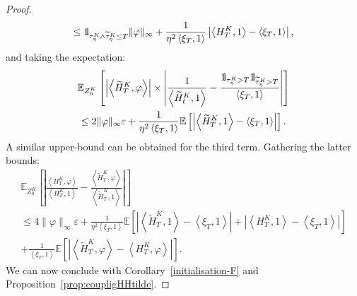\documentclass[10pt]{amsart}
\theoremstyle{definition}\newtheorem{defi}[theo]{Definition}\newtheorem{rema}[theo]{Remark}\newtheorem{exam}[theo]{Example}\newtheorem{exem}[theo]{Example}\newtheorem{nota}[theo]{Notation}
\newcommand*\E{\mathbb{E}}
\newcommand*\ind{{\mathchoice {\rm 1\mskip-4mu l} {\rm 1\mskip-4mu l} {\rm 1\mskip-4.5mu l} {\rm 1\mskip-5mu l}}}
\begin{document}
\begin{proof}
\begin{multline*}
\leq \ind_{\tau^K_\eta \wedge \widetilde{\tau}^K_\eta \leq T}
\|\varphi\|_\infty + \frac{1}{\eta^2\left\langle \xi_T,1\right\rangle}\left|\left\langle H^K_T,1\right\rangle - \left\langle \xi_T,1\right\rangle\right|,
\end{multline*}
and taking the expectation:
\begin{multline*}
\E_{Z^K_0}\left[\left|\left\langle \widetilde{H}^K_T,\varphi\right\rangle \right| \times \left|\frac{1}{\left\langle \widetilde{H}^K_t,1\right\rangle}- \frac{\ind_{\tau^K_\eta > T}\ind_{\widetilde{\tau}^K_\eta > T}}{\left\langle \xi_T,1\right\rangle}\right|\right]\\
\leq 2 \|\varphi\|_\infty \varepsilon + \frac{1}{\eta^2 \left\langle \xi_T,1\right\rangle}\E\left[\left|\left\langle \widetilde{H}^K_T,1\right\rangle - \left\langle \xi_T,1\right\rangle\right|\right].
\end{multline*}
A similar upper-bound can be obtained for the third term. Gathering the latter bounds:
\begin{multline*}
\E_{Z^K_0}\left[\left| \frac{\left\langle H^K_T,\varphi\right\rangle}{\left\langle H^K_T,1\right\rangle}-\frac{\left\langle \widetilde{H}^K_T,\varphi\right\rangle}{\left\langle \widetilde{H}^K_T,1\right\rangle}\right| \right]\\
\leq 4 \|\varphi\|_\infty \varepsilon + \frac{1}{\eta^2 \left\langle \xi_T,1\right\rangle}\E\left[\left|\left\langle \widetilde{H}^K_T,1\right\rangle - \left\langle \xi_T,1\right\rangle\right|+\left|\left\langle H^K_T,1\right\rangle - \left\langle \xi_T,1\right\rangle\right|\right]\\
+\frac{1}{\left\langle \xi_T,1\right\rangle}
\E\left[\left|\left\langle \widetilde{H}^K_T,\varphi\right\rangle - \left\langle H^K_T,\varphi\right\rangle\right|\right].
\end{multline*}
We can now conclude with Corollary~\ref{initialisation-F} and Proposition~\ref{prop:coupligHHtilde}.
\end{proof}
\end{document}
